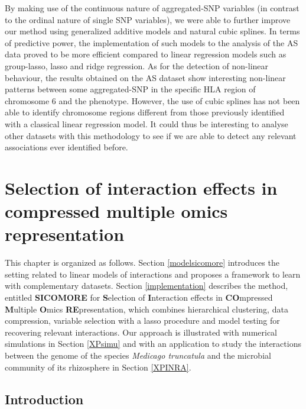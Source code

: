\documentclass[]{book}
\begin{document}
By making use of the continuous nature of aggregated-SNP variables (in
contrast to the ordinal nature of single SNP variables), we were able to
further improve our method using generalized additive models and natural
cubic splines. In terms of predictive power, the implementation of such
models to the analysis of the AS data proved to be more efficient
compared to linear regression models such as group-lasso, lasso and
ridge regression. As for the detection of non-linear behaviour, the
results obtained on the AS dataset show interesting non-linear patterns
between some aggregated-SNP in the specific HLA region of chromosome 6
and the phenotype. However, the use of cubic splines has not been able
to identify chromosome regions different from those previously
identified with a classical linear regression model. It could thus be
interesting to analyse other datasets with this methodology to see if we
are able to detect any relevant associations ever identified before.

\hypertarget{selection-of-interaction-effects-in-compressed-multiple-omics-representation}{%
\chapter{Selection of interaction effects in compressed multiple omics representation}\label{selection-of-interaction-effects-in-compressed-multiple-omics-representation}}

This chapter is organized as follows. Section \ref{modelsicomore}
introduces the setting related to linear models of interactions and
proposes a framework to learn with complementary
datasets. Section \ref{implementation} describes the method, entitled \textbf{SICOMORE} for \textbf{S}election of \textbf{I}nteraction effects in \textbf{CO}mpressed \textbf{M}ultiple \textbf{O}mics \textbf{RE}presentation,
which combines hierarchical clustering, data compression, variable selection with a lasso procedure and model testing for recovering relevant interactions.
Our approach is illustrated with numerical simulations in Section \ref{XPsimu} and with an application to study the interactions between the genome of the species \emph{Medicago truncatula} and the microbial community of its rhizosphere in Section \ref{XPINRA}.

\hypertarget{introduction-3}{%
\section{Introduction}\label{introduction-3}}
\end{document}
